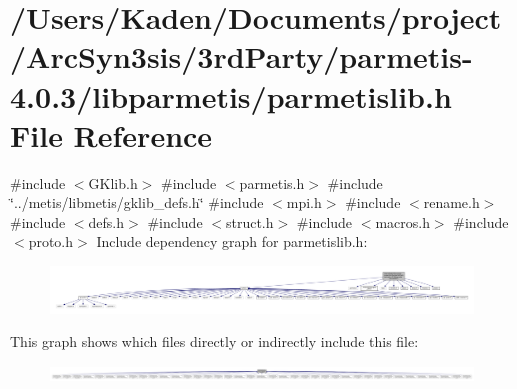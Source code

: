 \hypertarget{a00386}{}\section{/\+Users/\+Kaden/\+Documents/project/\+Arc\+Syn3sis/3rd\+Party/parmetis-\/4.0.3/libparmetis/parmetislib.h File Reference}
\label{a00386}
{\ttfamily \#include $<$G\+Klib.\+h$>$}\newline
{\ttfamily \#include $<$parmetis.\+h$>$}\newline
{\ttfamily \#include \char`\"{}../metis/libmetis/gklib\+\_\+defs.\+h\char`\"{}}\newline
{\ttfamily \#include $<$mpi.\+h$>$}\newline
{\ttfamily \#include $<$rename.\+h$>$}\newline
{\ttfamily \#include $<$defs.\+h$>$}\newline
{\ttfamily \#include $<$struct.\+h$>$}\newline
{\ttfamily \#include $<$macros.\+h$>$}\newline
{\ttfamily \#include $<$proto.\+h$>$}\newline
Include dependency graph for parmetislib.\+h\+:\nopagebreak
\begin{figure}[H]
\begin{center}
\leavevmode
\includegraphics[width=350pt]{a00387}
\end{center}
\end{figure}
This graph shows which files directly or indirectly include this file\+:\nopagebreak
\begin{figure}[H]
\begin{center}
\leavevmode
\includegraphics[width=350pt]{a00388}
\end{center}
\end{figure}
